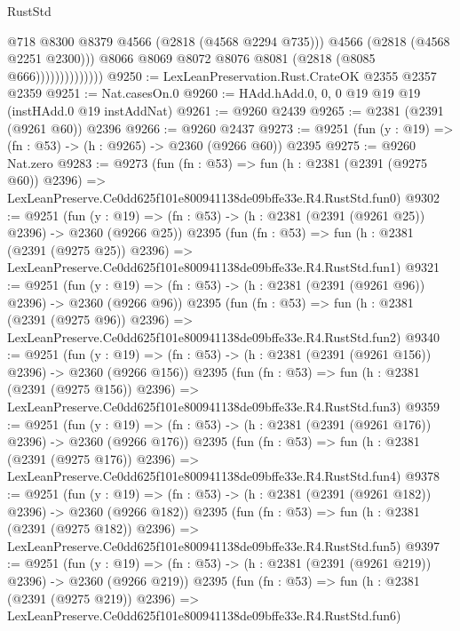 \begin{lexlean}{RustStd}
\begin{coremodule}
                                @718
                                @8300
                                @8379
                                @4566
                                (@2818 (@4568 @2294 @735)))
                              @4566
                              (@2818 (@4568 @2251 @2300)))
                            @8066
                            @8069
                            @8072
                            @8076
                            @8081
                            (@2818 (@8085 @666))))))))))))))
@9250 := LexLeanPreservation.Rust.CrateOK @2355 @2357 @2359
@9251 := Nat.casesOn.{0}
@9260 := HAdd.hAdd.{0, 0, 0} @19 @19 @19 (instHAdd.{0} @19 instAddNat)
@9261 := @9260 @2439
@9265 := @2381 (@2391 (@9261 @60)) @2396
@9266 := @9260 @2437
@9273 := @9251 (fun (y : @19) => (fn : @53) -> (h : @9265) -> @2360 (@9266 @60)) @2395
@9275 := @9260 Nat.zero
@9283 := @9273
    (fun (fn : @53) =>
    fun (h : @2381 (@2391 (@9275 @60)) @2396) =>
    LexLeanPreserve.Ce0dd625f101e800941138de09bffe33e.R4.RustStd.fun0)
@9302 := @9251
    (fun (y : @19) => (fn : @53) -> (h : @2381 (@2391 (@9261 @25)) @2396) -> @2360 (@9266 @25))
    @2395
    (fun (fn : @53) =>
    fun (h : @2381 (@2391 (@9275 @25)) @2396) =>
    LexLeanPreserve.Ce0dd625f101e800941138de09bffe33e.R4.RustStd.fun1)
@9321 := @9251
    (fun (y : @19) => (fn : @53) -> (h : @2381 (@2391 (@9261 @96)) @2396) -> @2360 (@9266 @96))
    @2395
    (fun (fn : @53) =>
    fun (h : @2381 (@2391 (@9275 @96)) @2396) =>
    LexLeanPreserve.Ce0dd625f101e800941138de09bffe33e.R4.RustStd.fun2)
@9340 := @9251
    (fun (y : @19) => (fn : @53) -> (h : @2381 (@2391 (@9261 @156)) @2396) -> @2360 (@9266 @156))
    @2395
    (fun (fn : @53) =>
    fun (h : @2381 (@2391 (@9275 @156)) @2396) =>
    LexLeanPreserve.Ce0dd625f101e800941138de09bffe33e.R4.RustStd.fun3)
@9359 := @9251
    (fun (y : @19) => (fn : @53) -> (h : @2381 (@2391 (@9261 @176)) @2396) -> @2360 (@9266 @176))
    @2395
    (fun (fn : @53) =>
    fun (h : @2381 (@2391 (@9275 @176)) @2396) =>
    LexLeanPreserve.Ce0dd625f101e800941138de09bffe33e.R4.RustStd.fun4)
@9378 := @9251
    (fun (y : @19) => (fn : @53) -> (h : @2381 (@2391 (@9261 @182)) @2396) -> @2360 (@9266 @182))
    @2395
    (fun (fn : @53) =>
    fun (h : @2381 (@2391 (@9275 @182)) @2396) =>
    LexLeanPreserve.Ce0dd625f101e800941138de09bffe33e.R4.RustStd.fun5)
@9397 := @9251
    (fun (y : @19) => (fn : @53) -> (h : @2381 (@2391 (@9261 @219)) @2396) -> @2360 (@9266 @219))
    @2395
    (fun (fn : @53) =>
    fun (h : @2381 (@2391 (@9275 @219)) @2396) =>
    LexLeanPreserve.Ce0dd625f101e800941138de09bffe33e.R4.RustStd.fun6)

\end{coremodule}
\end{lexlean}
